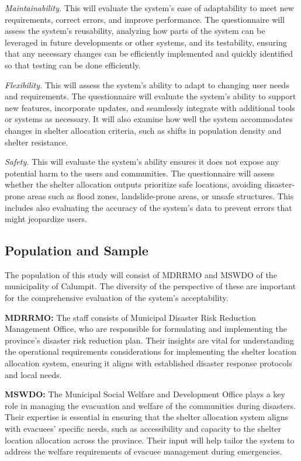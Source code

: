 	\textit{Maintainability.} This will evaluate the system's ease of adaptability to meet new requirements, correct errors, and improve performance. The questionnaire will assess the system's reusability, analyzing how parts of the system can be leveraged in future developments or other systems, and its testability, ensuring that any necessary changes can be efficiently implemented and quickly identified so that testing can be done efficiently. 
	
	\textit{Flexibility.} This will assess the system’s ability to adapt to changing user needs and requirements. The questionnaire will evaluate the system's ability to support new features, incorporate updates, and seamlessly integrate with additional tools or systems as necessary. It will also examine how well the system accommodates changes in shelter allocation criteria, such as shifts in population density and shelter resistance.
	
	\textit{Safety.} This will evaluate the system's ability ensures it does not expose any potential harm to the users and communities. The questionnaire will assess whether the shelter allocation outputs prioritize safe locations, avoiding disaster-prone areas such as flood zones, landslide-prone areas, or unsafe structures. This includes also evaluating the accuracy of the system's data to prevent errors that might jeopardize users.

\subsection{Population and Sample}
	The population of this study will consist of MDRRMO and MSWDO of the municipality of Calumpit. The diversity of the perspective of these are important for the comprehensive evaluation of the system’s acceptability.
	
	\textbf{MDRRMO:} The staff consists of Municipal Disaster Risk Reduction Management Office, who are responsible for formulating and implementing the province's disaster risk reduction plan.  Their insights are vital for understanding the operational requirements considerations for implementing the shelter location allocation system, ensuring it aligns with established disaster response protocols and local needs.
	
	\textbf{MSWDO:} The Municipal Social Welfare and Development Office plays a key role in managing the evacuation and welfare of the communities during disasters. Their expertise is essential in ensuring that the shelter allocation system aligns with evacuees' specific needs, such as accessibility and capacity to the shelter location allocation across the province. Their input will help tailor the system to address the welfare requirements of evacuee management during emergencies.
	
